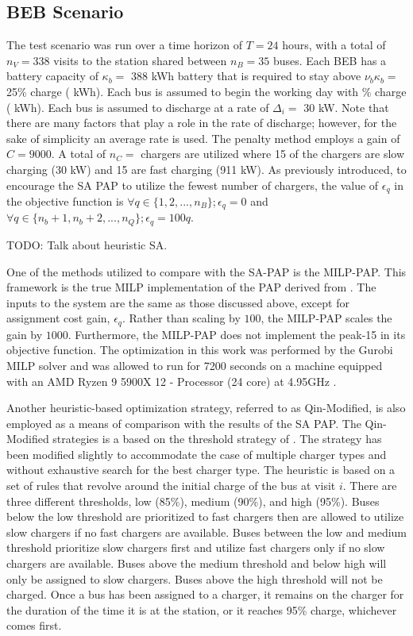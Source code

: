 \documentclass[11pt,a4paper,final]{article}
\newcommand{\A}{35 }                                                            %
\newcommand{\N}{338 }                                                           %
\newcommand{\Cgain}{9000}                                                       %
\newcommand{\acharge}{0.9}                                                      %
\newcommand{\mincharge}{25\% }                                                  %
\newcommand{\minchargeD}{0.25 }                                                 %
\newcommand{\batsize}{388 }                                                     %
\newcommand{\fast}{15 }                                                         %
\newcommand{\slow}{15 }                                                         %
\newcommand{\fasts}{911 }                                                       %
\newcommand{\slows}{30 }                                                        %
\begin{document}
\subsection{BEB Scenario}
\label{beb-scenario}
The test scenario was run over a time horizon of \(T=24\) hours, with a total of \(n_V = \N\) visits to the station shared
between \(n_B = \A\) buses. Each BEB has a battery capacity of \(\kappa_b =\) \batsize kWh battery that is required to stay above
\(\nu_b\kappa_b =\) \mincharge charge (\fpeval{\batsize * \minchargeD} kWh). Each bus is assumed to begin the working day with
\fpeval{\acharge*100}\% charge (\fpeval{\acharge * \batsize} kWh). Each bus is assumed to discharge at a rate of \(\Delta_i =\)
30 kW. Note that there are many factors that play a role in the rate of discharge; however, for the sake of simplicity
an average rate is used. The penalty method employs a gain of \(C = \Cgain\). A total of \(n_C =\) \fpeval{\fast + \slow}
chargers are utilized where \slow of the chargers are slow charging (\slows kW) and \fast are fast charging (\fasts kW).
As previously introduced, to encourage the SA PAP to utilize the fewest number of chargers, the value of \(\epsilon_q\) in the
objective function is \(\forall q \in \{1,2,..., n_B \}; \epsilon_q = 0\) and \(\forall q \in \{n_b + 1, n_b + 2,..., n_Q \}; \epsilon_q = 100q\).

TODO: Talk about heuristic SA.

One of the methods utilized to compare with the SA-PAP is the MILP-PAP. This framework is the true MILP implementation
of the PAP derived from \cite{qarebagh-2019-optim-sched}. The inputs to the system are the same as those discussed
above, except for assignment cost gain, \(\epsilon_q\). Rather than scaling by \(100\), the MILP-PAP scales the gain by \(1000\).
Furthermore, the MILP-PAP does not implement the peak-15 in its objective function. The optimization in this work was
performed by the Gurobi MILP solver and was allowed to run for 7200 seconds on a machine equipped with an AMD Ryzen 9
5900X 12 - Processor (24 core) at 4.95GHz \cite{gurobi-2021-gurob-optim}.

Another heuristic-based optimization strategy, referred to as Qin-Modified, is also employed as a means of comparison
with the results of the SA PAP. The Qin-Modified strategies is a based on the threshold strategy of
\cite{qin-2016-numer-analy}. The strategy has been modified slightly to accommodate the case of multiple charger types
and without exhaustive search for the best charger type. The heuristic is based on a set of rules that revolve around
the initial charge of the bus at visit \(i\). There are three different thresholds, low (85\%), medium (90\%), and high
(95\%). Buses below the low threshold are prioritized to fast chargers then are allowed to utilize slow chargers if no
fast chargers are available. Buses between the low and medium threshold prioritize slow chargers first and utilize fast
chargers only if no slow chargers are available. Buses above the medium threshold and below high will only be assigned
to slow chargers. Buses above the high threshold will not be charged. Once a bus has been assigned to a charger, it
remains on the charger for the duration of the time it is at the station, or it reaches 95\% charge, whichever comes
first.
\end{document}
